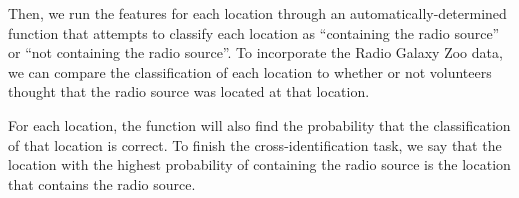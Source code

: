 \documentclass[a4paper]{article}
\begin{document}
    Then, we run the features for each location through an automatically-determined function that attempts to classify each location as ``containing the radio source'' or ``not containing the radio source''. To incorporate the Radio Galaxy Zoo data, we can compare the classification of each location to whether or not volunteers thought that the radio source was located at that location.

    For each location, the function will also find the probability that the classification of that location is correct. To finish the cross-identification task, we say that the location with the highest probability of containing the radio source is the location that contains the radio source.


% 
% 
\end{document}
